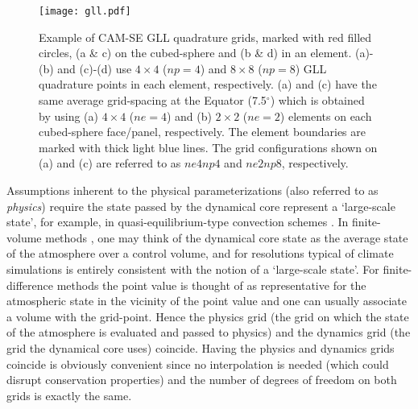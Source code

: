 \documentclass{ametsoc}
\begin{document}
\begin{figure}[t]
\begin{center}
\noindent\texttt{[image: gll.pdf]}\\
\end{center}
\noindent
\caption{Example of CAM-SE GLL quadrature grids, marked with red filled circles, (a \& c) on the cubed-sphere and (b \& d) in an element. (a)-(b) and (c)-(d) use $4\times 4$ ($np=4$) and $8\times 8$ ($np=8$) GLL quadrature points in each element, respectively. (a) and (c) have the same average grid-spacing at the Equator (7.5$^\circ$) which is obtained by using (a) $4\times 4$ ($ne=4$) and (b) $2\times 2$ ($ne=2$) elements on each cubed-sphere face/panel, respectively. The element boundaries are marked with thick light blue lines. The grid configurations shown on (a) and (c) are referred to as $ne4np4$ and $ne2np8$, respectively.}
\label{fig:gll-grids}
\end{figure}

Assumptions inherent to the physical parameterizations (also referred to as {\em{physics}}) require the state passed by the dynamical core represent a `large-scale state', for example, in quasi-equilibrium-type convection schemes \citep{AS1974JAS,PC2008JAS}. In finite-volume methods \citep[e.g., ][]{L2004MWR}, one may think of the dynamical core state as the average state of the atmosphere over a control volume, and for resolutions typical of climate simulations is entirely consistent with the notion of a `large-scale state'. For finite-difference methods \citep[e.g., ][]{SETAL983MWR} the point value is thought of as representative for the atmospheric state in the vicinity of the point value and one can usually associate a volume with the grid-point. Hence the physics grid (the grid on which the state of the atmosphere is evaluated and passed to physics) and the dynamics grid (the grid the dynamical core uses) coincide. Having the physics and dynamics grids coincide is obviously convenient since no interpolation is needed (which could disrupt conservation properties) and the number of degrees of freedom on both grids is exactly the same. 
\end{document}
